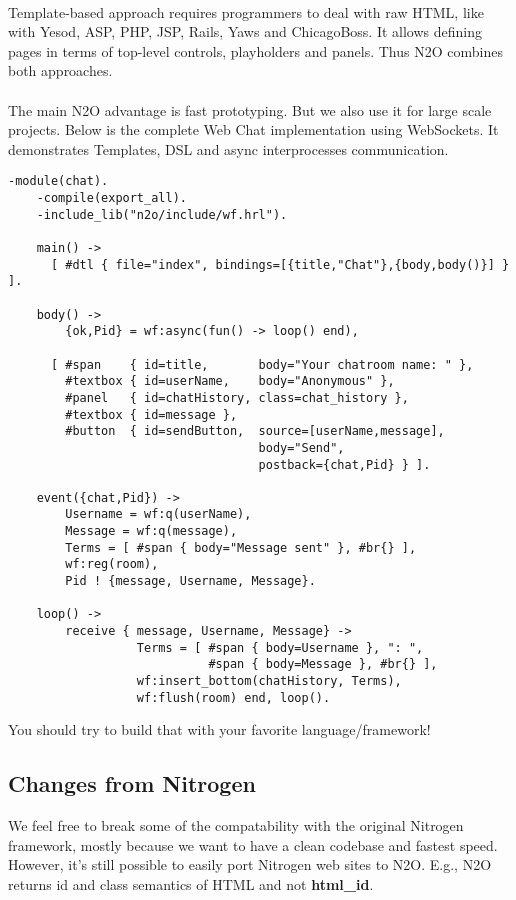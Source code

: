\paragraph{}
Template-based approach requires programmers to deal with raw HTML,
like with Yesod, ASP, PHP, JSP, Rails, Yaws and ChicagoBoss. It allows
defining pages in terms of top-level controls, playholders
and panels. Thus N2O combines both approaches.

\paragraph{}
The main N2O advantage is fast prototyping. But we also use it for large
scale projects. Below is the complete Web Chat implementation using
WebSockets. It demonstrates Templates, DSL and async
interprocesses communication.

\newpage
\begin{lstlisting}[caption=chat.erl]
    -module(chat).
    -compile(export_all).
    -include_lib("n2o/include/wf.hrl").

    main() -> 
      [ #dtl { file="index", bindings=[{title,"Chat"},{body,body()}] } ].

    body() ->
        {ok,Pid} = wf:async(fun() -> loop() end),

      [ #span    { id=title,       body="Your chatroom name: " }, 
        #textbox { id=userName,    body="Anonymous" },
        #panel   { id=chatHistory, class=chat_history },
        #textbox { id=message },
        #button  { id=sendButton,  source=[userName,message],
                                   body="Send", 
                                   postback={chat,Pid} } ].

    event({chat,Pid}) ->
        Username = wf:q(userName),
        Message = wf:q(message),
        Terms = [ #span { body="Message sent" }, #br{} ],
        wf:reg(room),
        Pid ! {message, Username, Message}.

    loop() ->
        receive { message, Username, Message} ->
                  Terms = [ #span { body=Username }, ": ",
                            #span { body=Message }, #br{} ],
                  wf:insert_bottom(chatHistory, Terms),
                  wf:flush(room) end, loop().
\end{lstlisting}

You should try to build that with your favorite language/framework!

\subsection*{Changes from Nitrogen}
We feel free to break some of the compatability with the original
Nitrogen framework, mostly because we want to have a clean codebase
and fastest speed. However, it's still possible to easily port
Nitrogen web sites to N2O. E.g., N2O returns id and class semantics
of HTML and not {\bf html\_id}.

